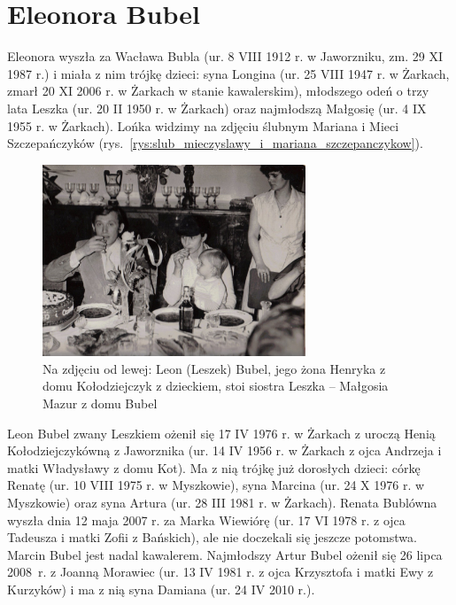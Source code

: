 \section{Eleonora Bubel}

Eleonora wyszła za Wacława Bubla (ur. 8 VIII 1912 r. w Jaworzniku, zm. 29 XI 1987 r.) i miała z nim trójkę dzieci: syna Longina (ur. 25 VIII 1947 r. w Żarkach, zmarł 20 XI 2006 r. w Żarkach w stanie kawalerskim), młodszego odeń o trzy lata Leszka (ur. 20 II 1950 r. w Żarkach) oraz najmłodszą Małgosię (ur. 4 IX 1955 r. w Żarkach). Lońka widzimy na zdjęciu ślubnym Mariana i Mieci Szczepańczyków (rys.~\ref{rys:slub_mieczyslawy_i_mariana_szczepanczykow}).

\begin{figure}[!h]
\begin{center}
\includegraphics[width=0.7\textwidth]{zdjecia/leon_henryka_malgosia_bubel.jpg}
\caption[Leon, Henryka i Małgorzata Bublowie]{Na zdjęciu od lewej: Leon (Leszek) Bubel, jego żona Henryka z domu Kołodziejczyk z dzieckiem, stoi siostra Leszka -- Małgosia Mazur z domu Bubel}
\label{rys:leon_henryka_malgosia_bubel}
\end{center}
\end{figure}

Leon Bubel zwany Leszkiem ożenił się 17 IV 1976 r. w Żarkach z uroczą Henią Kołodziejczykówną z Jaworznika (ur. 14 IV 1956 r. w Żarkach z ojca Andrzeja i matki Władysławy z domu Kot). Ma z nią trójkę już dorosłych dzieci: córkę Renatę (ur. 10 VIII 1975 r. w Myszkowie), syna Marcina (ur. 24 X 1976 r. w Myszkowie) oraz syna Artura (ur. 28 III 1981 r. w Żarkach). Renata Bublówna wyszła dnia 12 maja 2007 r.
za Marka Wiewiórę (ur. 17 VI 1978 r. z ojca Tadeusza i matki Zofii z Bańskich), ale nie doczekali się jeszcze potomstwa. Marcin Bubel jest nadal kawalerem. Najmłodszy Artur Bubel ożenił się 26 lipca 2008~r. z Joanną Morawiec (ur. 13 IV 1981 r. z ojca Krzysztofa i matki Ewy z Kurzyków) i ma z nią syna Damiana (ur. 24 IV 2010 r.).

